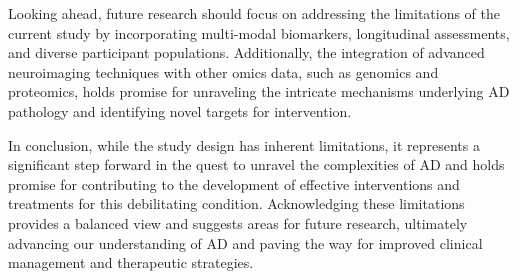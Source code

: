 \documentclass[10pt]{article}
\begin{document}
\begin{sloppypar}
  Looking ahead, future research should focus on addressing the limitations of the current study by incorporating multi-modal biomarkers, longitudinal assessments, and diverse participant populations. Additionally, the integration of advanced neuroimaging techniques with other omics data, such as genomics and proteomics, holds promise for unraveling the intricate mechanisms underlying AD pathology and identifying novel targets for intervention.

  In conclusion, while the study design has inherent limitations, it represents a significant step forward in the quest to unravel the complexities of AD and holds promise for contributing to the development of effective interventions and treatments for this debilitating condition. Acknowledging these limitations provides a balanced view and suggests areas for future research, ultimately advancing our understanding of AD and paving the way for improved clinical management and therapeutic strategies.

  \pagebreak
  \singlespacing %
  
  

\end{sloppypar}
\end{document}
